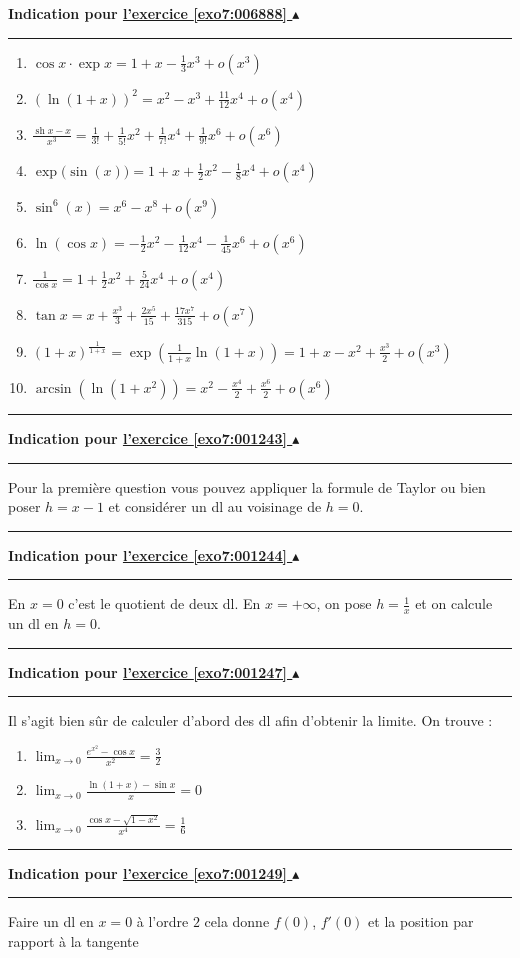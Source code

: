 \documentclass[11pt,a4paper]{article}
\newcommand{\sh}{\mathop{\mathrm{sh}}\nolimits}
\newcounter{exo}
\newcommand{\indication}[1]{\hypertarget{ind7:#1}{}\label{ind7:#1}{\bf Indication pour \hyperlink{exo7:#1}{l'exercice \ref{exo7:#1} $\blacktriangle$}}\vspace{1mm}\hrule\vspace{1mm}}
\newcommand{\finindication}{\vspace{1mm}\hrule\vspace*{7mm}}
\begin{document}
\indication{006888}
\begin{enumerate}
  \item $\cos x \cdot \exp x = 1 + x - \frac13 x^3 + o(x^3)$

  \item $\left( \ln (1+x) \right)^2= x^2-x^3+\frac{11}{12}x^4+ o(x^4)$

  \item $\frac{\sh x-x}{x^3} = \frac{1}{3!}+\frac{1}{5!}x^2+\frac{1}{7!}x^4+\frac{1}{9!}x^6 + o(x^6)$

  \item $\exp\big(\sin(x)\big)=1+x + \frac12 x^2 - \frac18 x^4+ o(x^4)$

  \item $\sin^6 (x)  =  x^6-x^8 + o(x^9)$

  \item $\ln(\cos x) =  - \frac{1}{2} x^2 -\frac{1}{12}x^4 -\frac{1}{45}x^6  + o(x^6)$

  \item $\frac{1}{\cos x} = 1+\frac{1}{2}x^2+\frac{5}{24}x^4 + o(x^4)$

  \item $\tan x = x + \frac{x^3}{3} + \frac{2x^5}{15} + \frac{17x^7}{315} + o(x^7)$

  \item $(1+x)^{\frac{1}{1+x}} =  \exp\left( \frac{1}{1+x} \ln(1+x) \right) = 1+x-x^2 + \frac{x^3}{2} + o(x^3)$

  \item  $\arcsin \left ( \ln(1+x^2) \right ) = x^2-\frac{x^4}{2}+\frac{x^6}{2}+o(x^6)$
\end{enumerate}
\finindication
\indication{001243}
Pour la première question vous pouvez appliquer la formule de Taylor ou bien 
poser $h=x-1$ et considérer un dl au voisinage de $h=0$.
\finindication
\indication{001244}
En $x=0$ c'est le quotient de deux dl.
En $x=+\infty$, on pose $h=\frac1x$ et on calcule un dl en $h=0$.
\finindication 
\indication{001247}
Il s'agit bien sûr de calculer d'abord des dl afin d'obtenir la limite.
On trouve : 
\begin{enumerate}
  \item $\lim_{x\rightarrow 0}\frac{e^{x^2}-\cos x}{x^2} = \frac32$
  \item $\lim_{x\rightarrow 0}\frac{\ln (1+x)-\sin x}{x} = 0$
  \item $\lim_{x\rightarrow 0}\frac{\cos x-\sqrt{1-x^2}}{x^4}=\frac16$
\end{enumerate}
\finindication
\indication{001249}
Faire un dl en $x=0$ à l'ordre $2$ cela donne $f(0)$, $f'(0)$ et la position par rapport à la tangente
\end{document}
